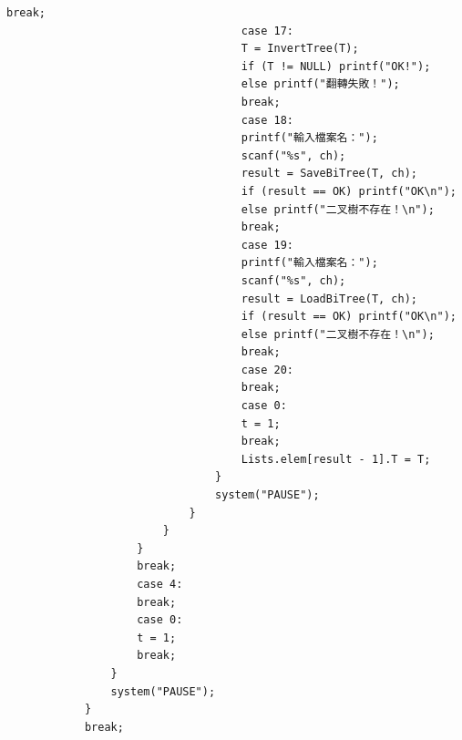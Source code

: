 \documentclass[supercite]{Experimental_Report}
\theoremstyle{definition}
\begin{document}
\begin{lstlisting}[style=commonCodeStyle, caption={目标程序}, label={lst:2-17}]
									break;      
									case 17:
									T = InvertTree(T);
									if (T != NULL) printf("OK!");                
									else printf("翻轉失敗！");
									break; 
									case 18:
									printf("輸入檔案名：");
									scanf("%s", ch);
									result = SaveBiTree(T, ch);
									if (result == OK) printf("OK\n");
									else printf("二叉樹不存在！\n");                
									break;
									case 19:
									printf("輸入檔案名：");
									scanf("%s", ch);
									result = LoadBiTree(T, ch);
									if (result == OK) printf("OK\n");
									else printf("二叉樹不存在！\n");                       
									break;
									case 20:
									break;
									case 0:
									t = 1;
									break;
									Lists.elem[result - 1].T = T;   
								}
								system("PAUSE");                
							}                               
						}
					}                                   
					break;
					case 4:
					break;
					case 0:
					t = 1;
					break;                                                                      
				}       
				system("PAUSE");                        
			}
			break;
			

\end{lstlisting}
\end{document}

